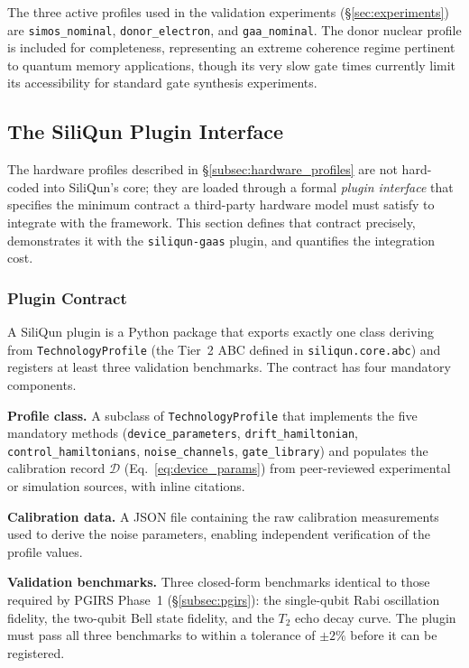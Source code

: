 The three active profiles used in the validation experiments
(\S\ref{sec:experiments}) are \texttt{simos\_nominal},
\texttt{donor\_electron}, and \texttt{gaa\_nominal}.
The donor nuclear profile is included for completeness, representing
an extreme coherence regime pertinent to quantum memory applications,
though its very slow gate times currently limit its accessibility for
standard gate synthesis experiments.

\subsection{The SiliQun Plugin Interface}
\label{subsec:plugin_interface}

The hardware profiles described in \S\ref{subsec:hardware_profiles} are
not hard-coded into SiliQun's core; they are loaded through a formal
\emph{plugin interface} that specifies the minimum contract a third-party
hardware model must satisfy to integrate with the framework.
This section defines that contract precisely, demonstrates it with the
\texttt{siliqun-gaas} plugin, and quantifies the integration cost.

\subsubsection{Plugin Contract}

A SiliQun plugin is a Python package that exports exactly one class
deriving from \texttt{TechnologyProfile} (the Tier~2 ABC defined in
\texttt{siliqun.core.abc}) and registers at least three validation
benchmarks. The contract has four mandatory components.

\textbf{Profile class.} A subclass of \texttt{TechnologyProfile} that
implements the five mandatory methods (\texttt{device\_parameters},
\texttt{drift\_hamiltonian}, \texttt{control\_hamiltonians},
\texttt{noise\_channels}, \texttt{gate\_library}) and populates the
calibration record $\mathcal{D}$ (Eq.~\ref{eq:device_params}) from
peer-reviewed experimental or simulation sources, with inline citations.

\textbf{Calibration data.} A JSON file containing the raw calibration
measurements used to derive the noise parameters, enabling independent
verification of the profile values.

\textbf{Validation benchmarks.} Three closed-form benchmarks identical
to those required by PGIRS Phase~1 (\S\ref{subsec:pgirs}): the
single-qubit Rabi oscillation fidelity, the two-qubit Bell state
fidelity, and the $T_2$ echo decay curve. The plugin must pass all
three benchmarks to within a tolerance of $\pm 2\%$ before it can be
registered.

